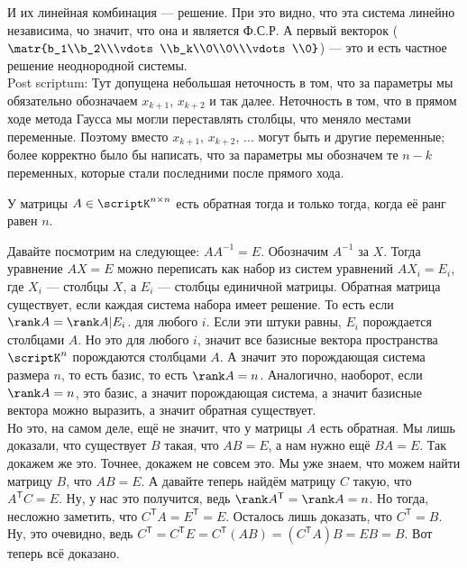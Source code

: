 \documentclass{article}
\newcommand*{\trans}{^{\mathsf T}}
\begin{document}
\begin{itemize}
\begin{Comment}
            И их линейная комбинация --- решение. При это видно, что эта система линейно независима, чо значит, что она и является Ф.С.Р. А первый векторок ($\matr{b_1\\b_2\\\vdots\\b_k\\0\\0\\\vdots\\0}$) --- это и есть частное решение неоднородной системы.\\
            Post scriptum: Тут допущена небольшая неточность в том, что за параметры мы обязательно обозначаем $x_{k+1}$, $x_{k+2}$ и так далее. Неточность в том, что в прямом ходе метода Гаусса мы могли переставлять столбцы, что меняло местами переменные. Поэтому вместо $x_{k+1}$, $x_{k+2}$, ... могут быть и другие переменные; более корректно было бы написать, что за параметры мы обозначем те $n-k$ переменных, которые стали последними после прямого хода.
        \end{Comment}
        \thm У матрицы $A\in\scriptK^{n\times n}$ есть обратная тогда и только тогда, когда её ранг равен $n$.
        \begin{Proof}
            Давайте посмотрим на следующее: $AA^{-1}=E$. Обозначим $A^{-1}$ за $X$. Тогда уравнение $AX=E$ можно переписать как набор из систем уравнений $AX_i=E_i$, где $X_i$ --- столбцы $X$, а $E_i$ --- столбцы единичной матрицы. Обратная матрица существует, если каждая система набора имеет решение. То есть если $\rank A=\rank A|E_i$. для любого $i$. Если эти штуки равны, $E_i$ порождается столбцами $A$. Но это для любого $i$, значит все базисные вектора пространства $\scriptK^n$ порождаются столбцами $A$. А значит это порождающая система размера $n$, то есть базис, то есть $\rank A=n$. Аналогично, наоборот, если $\rank A=n$, это базис, а значит порождающая система, а значит базисные вектора можно выразить, а значит обратная существует.\\
            Но это, на самом деле, ещё не значит, что у матрицы $A$ есть обратная. Мы лишь доказали, что существует $B$ такая, что $AB=E$, а нам нужно ещё $BA=E$. Так докажем же это. Точнее, докажем не совсем это. Мы уже знаем, что можем найти матрицу $B$, что $AB=E$. А давайте теперь найдём матрицу $C$ такую, что $A\trans C=E$. Ну, у нас это получится, ведь $\rank A\trans=\rank A=n$. Но тогда, несложно заметить, что $C\trans A=E\trans=E$. Осталось лишь доказать, что $C\trans=B$. Ну, это очевидно, ведь $C\trans=C\trans E=C\trans(AB)=(C\trans A)B=EB=B$. Вот теперь всё доказано.

\end{Proof}
\end{itemize}
\end{document}
